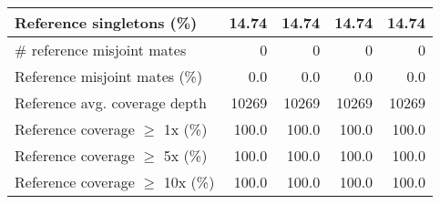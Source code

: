 \documentclass[12pt,a4paper]{article}
\begin{document}
\begin{table}[ht]
\begin{center}
\begin{tabular}{|l*{4}{|r}|}
Reference singletons (\%) & 14.74 & 14.74 & 14.74 & 14.74 \\ \hline
\# reference misjoint mates & 0 & 0 & 0 & 0 \\ \hline
Reference misjoint mates (\%) & 0.0 & 0.0 & 0.0 & 0.0 \\ \hline
Reference avg. coverage depth & 10269 & 10269 & 10269 & 10269 \\ \hline
Reference coverage $\geq$ 1x (\%) & 100.0 & 100.0 & 100.0 & 100.0 \\ \hline
Reference coverage $\geq$ 5x (\%) & 100.0 & 100.0 & 100.0 & 100.0 \\ \hline
Reference coverage $\geq$ 10x (\%) & 100.0 & 100.0 & 100.0 & 100.0 \\ \hline
\end{tabular}
\end{center}
\end{table}
\end{document}
